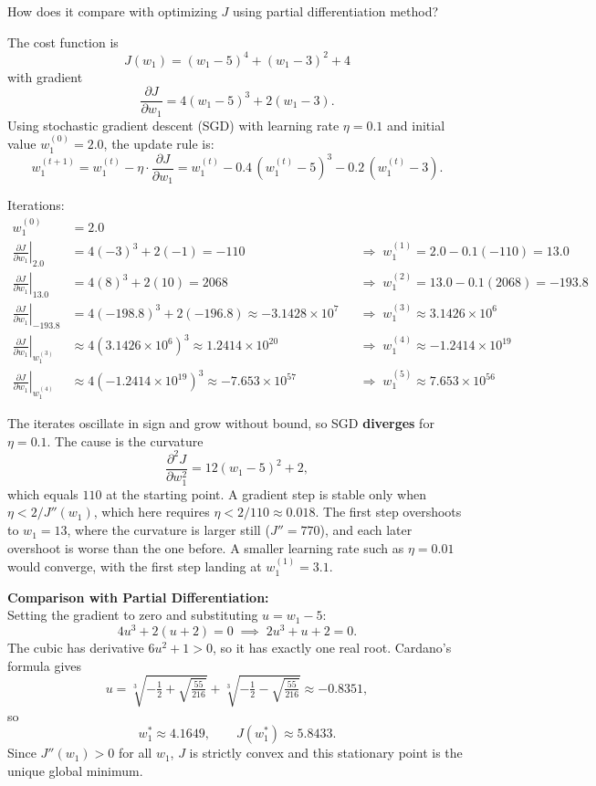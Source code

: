\documentclass[12pt, xcolor=dvipsnames,svgnames,x11names]{article}
\begin{document}
How does it compare with optimizing $J$ using partial differentiation method?
\begin{answerbox}
\noindent The cost function is
$$J(w_1) = (w_1 - 5)^4 + (w_1 - 3)^2 + 4$$
with gradient
$$\frac{\partial J}{\partial w_1} = 4(w_1 - 5)^3 + 2(w_1 - 3).$$
Using stochastic gradient descent (SGD) with learning rate $\eta = 0.1$ and initial value $w_1^{(0)} = 2.0$, the update rule is:
$$w_1^{(t+1)} = w_1^{(t)} - \eta \cdot \frac{\partial J}{\partial w_1}
            = w_1^{(t)} - 0.4\,(w_1^{(t)} - 5)^3 - 0.2\,(w_1^{(t)} - 3).$$

\noindent Iterations:
$$\begin{aligned}
w_1^{(0)} &= 2.0 \\[4pt]
\left.\frac{\partial J}{\partial w_1}\right|_{2.0} &= 4(-3)^3 + 2(-1) = -110
  &&\Rightarrow\; w_1^{(1)} = 2.0 - 0.1(-110) = 13.0 \\[4pt]
\left.\frac{\partial J}{\partial w_1}\right|_{13.0} &= 4(8)^3 + 2(10) = 2068
  &&\Rightarrow\; w_1^{(2)} = 13.0 - 0.1(2068) = -193.8 \\[4pt]
\left.\frac{\partial J}{\partial w_1}\right|_{-193.8} &= 4(-198.8)^3 + 2(-196.8) \approx -3.1428 \times 10^{7}
  &&\Rightarrow\; w_1^{(3)} \approx 3.1426 \times 10^{6} \\[4pt]
\left.\frac{\partial J}{\partial w_1}\right|_{w_1^{(3)}} &\approx 4(3.1426 \times 10^{6})^3 \approx 1.2414 \times 10^{20}
  &&\Rightarrow\; w_1^{(4)} \approx -1.2414 \times 10^{19} \\[4pt]
\left.\frac{\partial J}{\partial w_1}\right|_{w_1^{(4)}} &\approx 4(-1.2414 \times 10^{19})^3 \approx -7.653 \times 10^{57}
  &&\Rightarrow\; w_1^{(5)} \approx 7.653 \times 10^{56}
\end{aligned}$$

\noindent The iterates oscillate in sign and grow without bound, so SGD \textbf{diverges} for $\eta = 0.1$.
The cause is the curvature
$$\frac{\partial^2 J}{\partial w_1^2} = 12(w_1 - 5)^2 + 2,$$
which equals $110$ at the starting point. A gradient step is stable only when $\eta < 2 / J''(w_1)$, which here requires $\eta < 2/110 \approx 0.018$.
The first step overshoots to $w_1 = 13$, where the curvature is larger still ($J'' = 770$), and each later overshoot is worse than the one before.
A smaller learning rate such as $\eta = 0.01$ would converge, with the first step landing at $w_1^{(1)} = 3.1$.

\bigskip
\noindent \textbf{Comparison with Partial Differentiation:} \\
Setting the gradient to zero and substituting $u = w_1 - 5$:
$$4u^3 + 2(u + 2) = 0 \;\implies\; 2u^3 + u + 2 = 0.$$
The cubic has derivative $6u^2 + 1 > 0$, so it has exactly one real root. Cardano's formula gives
$$u = \sqrt[3]{-\tfrac{1}{2} + \sqrt{\tfrac{55}{216}}} + \sqrt[3]{-\tfrac{1}{2} - \sqrt{\tfrac{55}{216}}} \approx -0.8351,$$
so
$$w_1^{*} \approx 4.1649, \qquad J(w_1^{*}) \approx 5.8433.$$
Since $J''(w_1) > 0$ for all $w_1$, $J$ is strictly convex and this stationary point is the unique global minimum.


\end{answerbox}
\end{document}
